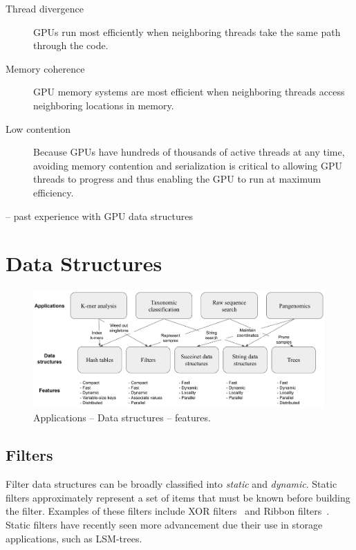 \begin{description}
  \item[Thread divergence] GPUs run most efficiently when neighboring threads take the same path through the code.
  \item[Memory coherence] GPU memory systems are most efficient when neighboring threads access neighboring locations in memory.
  \item[Low contention] Because GPUs have hundreds of thousands of active threads at any time, avoiding memory contention and serialization is critical to allowing GPU threads to progress and thus enabling the GPU to run at maximum efficiency.
\end{description}


-- past experience with GPU data structures





\section{Data Structures}

\setlength\intextsep{0pt}
\begin{figure}
\vspace{-5pt}
\centering
\includegraphics[width=4.4in]{proposal/images/PPoSS_App_DS.png}
\caption{Applications -- Data structures -- features.}
\label{fig1}
\end{figure}

\subsection{Filters}\label{sec:prelim}

Filter data structures can be broadly classified into \emph{static} and
\emph{dynamic}.  Static filters approximately represent a set of items that must
be known before building the filter. Examples of these filters include XOR
filters~\cite{GrafLe20} and Ribbon filters~\cite{DillingerWalzer21}. Static
filters have recently seen more advancement due their use in storage
applications, such as LSM-trees.


